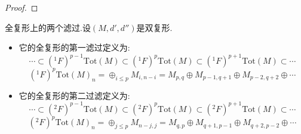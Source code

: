 \begin{enumerate}
\begin{proof}
    	
    \end{proof}
\end{enumerate}

全复形上的两个滤过.设$(M,d',d'')$是双复形.
\begin{itemize}
	\item 它的全复形的第一滤过定义为:
	$$\cdots\subset(^1F)^{p-1}\mathrm{Tot}(M)\subset(^1F)^p\mathrm{Tot}(M)\subset (^1F)^{p+1}\mathrm{Tot}(M)\subset\cdots$$
	$$(^1F)^p\mathrm{Tot}(M)_n=\oplus_{i\le p}M_{i,n-i}=M_{p,q}\oplus M_{p-1,q+1}\oplus M_{p-2,q+2}\oplus\cdots$$
	\item 它的全复形的第二过滤定义为:
	$$\cdots\subset(^2F)^{p-1}\mathrm{Tot}(M)\subset(^2F)^p\mathrm{Tot}(M)\subset (^2F)^{p+1}\mathrm{Tot}(M)\subset\cdots$$
	$$(^2F)^p\mathrm{Tot}(M)_n=\oplus_{j\le p}M_{n-j,j}=M_{q,p}\oplus M_{q+1,p-1}\oplus M_{q+2,p-2}\oplus\cdots$$
\end{itemize}
